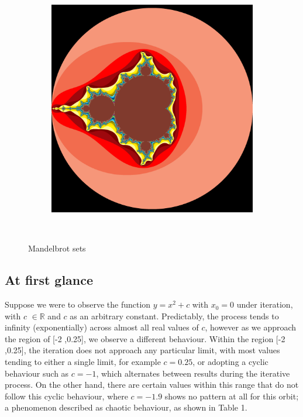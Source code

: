 \documentclass[a4paper]{article}
\begin{document}
\begin{figure}[h]
\begin{subfigure}[h]{0.45\textwidth}
        \includegraphics[width=\textwidth]{MandelbrotColoured}
    \end{subfigure}
    ~ %
    \caption{Mandelbrot sets}\label{fig:MSets}
\end{figure} 

\subsection{At first glance}

Suppose we were to observe the function $y = x^2 + c$ with $x_{0} = 0$ under iteration, with $c$ $\in \mathbb{R}$ and $c$ as an arbitrary constant. Predictably, the process tends to infinity (exponentially) across almost all real values of $c$, however as we approach the region of [-2 ,0.25], we observe a different behaviour. 
Within the region [-2 ,0.25], the iteration does not approach any particular limit, with most values tending to either a single limit, for example $c = 0.25$, or adopting a cyclic behaviour such as $c = -1$, which alternates between results during the iterative process. On the other hand, there are certain values within this range that do not follow this cyclic behaviour, where $c =-1.9$ shows no pattern at all for this orbit; a phenomenon described as chaotic behaviour, as shown in Table 1.
\end{document}
